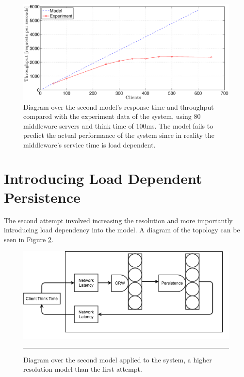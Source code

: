 \documentclass[a4paper, 11pt]{article}
\begin{document}
		\begin{figure}[cht!]
			\centering
				\includegraphics[width=1\linewidth,keepaspectratio]{firstRealAndModelFail}
			\caption{Diagram over the second model's response time and throughput compared with the experiment data of the system, using 80 middleware servers and think time of 100ms. The model fails to predict the actual performance of the system since in reality the middleware's service time is load dependent.}
			\label{fig:firstmodelResultsFail}
		\end{figure}
		\FloatBarrier


\section{Introducing Load Dependent Persistence}\label{sec:second-model}

	The second attempt involved increasing the resolution and more importantly introducing load dependency into the model. A diagram of the topology can be seen in Figure \ref{fig:second-model}.

	\FloatBarrier
	\begin{figure}[cht!]
		\centering
			\includegraphics[width=0.8\linewidth]{secondmodel}
			\rule{35em}{0.5pt}
		\caption{Diagram over the second model applied to the system, a higher resolution model than the first attempt.}
		\label{fig:second-model}
	\end{figure}
	\FloatBarrier
\end{document}

